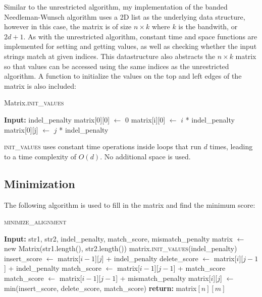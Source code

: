 \documentclass[12pt]{article}
\begin{document}
Similar to the unrestricted algorithm, my implementation of the banded
Needleman-Wunsch algorithm uses a 2D list as the underlying data structure,
however in this case, the matrix is of size $n \times k$ where $k$ is the
bandwith, or $2d + 1$. As with the unrestricted algorithm, constant time
and space functions are implemented for setting and getting values, as well as
checking whether the input strings match at given indices. This datastructure
also abstracts the $n \times k$ matrix so that values can be accessed using
the same indices as the unrestricted algorithm. A function to
initialize the values on the top and left edges of the matrix is also included:
\begin{algorithm}[H]
    \caption{Matrix.\textsc{init\_values}}
    \begin{algorithmic}[1]
        \State \textbf{Input:} indel\_penalty
        \State matrix[0][0] $\gets$ 0
         
            \State matrix[i][0] $\gets$ $i$ * indel\_penalty
        \EndFor
         
            \State matrix[0][j] $\gets$ $j$ * indel\_penalty
        \EndFor
    \end{algorithmic}
\end{algorithm}

\textsc{init\_values} uses constant time operations inside loops that
run $d$ times, leading to a time complexity of $O(d)$. No additional space
is used.

\subsection{Minimization}
The following algorithm is used to fill in the matrix and find
the minimum score:

\begin{algorithm}[H]
    \caption{\textsc{minimize\_alignment}}
    \begin{algorithmic}[1]
        \State \textbf{Input:} str1, str2, indel\_penalty, match\_score, mismatch\_penalty
        \State matrix $\gets$ new Matrix(str1.length(), str2.length()) 
        \State matrix.\textsc{init\_values}(indel\_penalty) 
         
             
                \State insert\_score $\gets$ matrix[$i-1$][$j$] + indel\_penalty
                \State delete\_score $\gets$ matrix[$i$][$j-1$] + indel\_penalty
                    \State match\_score $\gets$ matrix[$i-1$][$j-1$] + match\_score
                \Else
                    \State match\_score $\gets$ matrix[$i-1$][$j-1$] + mismatch\_penalty
                \EndIf
                \State matrix[$i$][$j$] $\gets$ min(insert\_score, delete\_score, match\_score)
            \EndFor
        \EndFor
        \State \textbf{return:} matrix$[n][m]$
    \end{algorithmic}
\end{algorithm}
\end{document}
